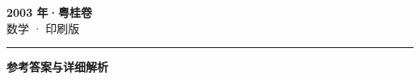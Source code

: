 \documentclass[zihao=5, a4paper]{ctexart}
\begin{document}
\begin{center}
  {\Large\bfseries 2003 年·粤桂卷}\\[4pt]
  {\large 数学 · 印刷版}
\end{center}
\medskip
{}

\par\bigskip\hrule\bigskip
{}
\begin{center}{\large\bfseries 参考答案与详细解析}\end{center}
\smallskip

\end{document}
